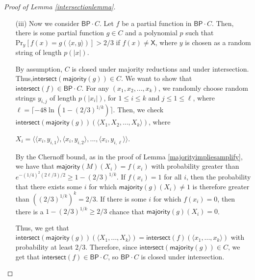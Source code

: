 \documentclass[11pt]{article}
\newcommand{\pr}{\text{Pr}}
\newcommand{\bp}{\textsf{BP}}
\newcommand{\x}{\textsf{X}}
\newcommand{\intersect}{\textsf{intersect}}
\newcommand{\majority}{\textsf{majority}}
\begin{document}
\begin{proof}[Proof of Lemma \ref{intersectionlemma}]
\begin{enumerate}
\item[(iii)] Now we consider $\bp \cdot C$. Let $f$ be a partial function in $\bp \cdot C$. Then, there is some partial function $g \in C$ and a polynomial $p$ such that $\pr_y[f(x) = g(\langle x,y\rangle)] > 2/3$ if $f(x) \ne \x$, where $y$ is chosen as a random string of length $p(|x|)$.

By assumption, $C$ is closed under majority reductions and under intersection. Thus,\linebreak $\intersect(\majority(g)) \in C$. We want to show that $\intersect(f) \in \bp\cdot C$. For any $(x_1,x_2,...,x_k)$, we randomly choose random strings $y_{i,j}$ of length $p(|x_i|)$, for $1\le i\le k$ and $j\le 1\le \ell$, where $\ell = \lceil -48\ln(1 - (2/3)^{1/k}) \rceil$. Then, we check $\intersect(\majority(g))(\langle X_1, X_2, ..., X_k\rangle)$, where
\begin{center}
$X_i = \langle\langle x_i,y_{i,1}\rangle,\langle x_{i},y_{i,2}\rangle,...,\langle x_{i},y_{i,\ell}\rangle\rangle$.
\end{center}
By the Chernoff bound, as in the proof of Lemma \ref{majorityimpliesamplify}, we have that $\majority(M)(X_i) = f(x_i)$ with probability greater than $e^{-(1/4)^2 (2\ell/3)/2} \ge 1 - (2/3)^{1/k}$. If $f(x_i) = 1$ for all $i$, then the probability that there exists some $i$ for which $\majority(g)(X_i) \ne 1$ is therefore greater than $((2/3)^{1/k})^k = 2/3$. If there is some $i$ for which $f(x_i) = 0$, then there is a $1 - (2/3)^{1/k} \ge 2/3$ chance that $\majority(g)(X_i) = 0$.

Thus, we get that $\intersect(\majority(g))(\langle X_1,...,X_k\rangle) = \intersect(f)(\langle x_1,...,x_k\rangle)$ with probability at least $2/3$. Therefore, since $\intersect(\majority(g)) \in C$, we get that $\intersect(f) \in \bp \cdot C$, so $\bp \cdot C$ is closed under intersection.



\end{enumerate}
\end{proof}
\end{document}
